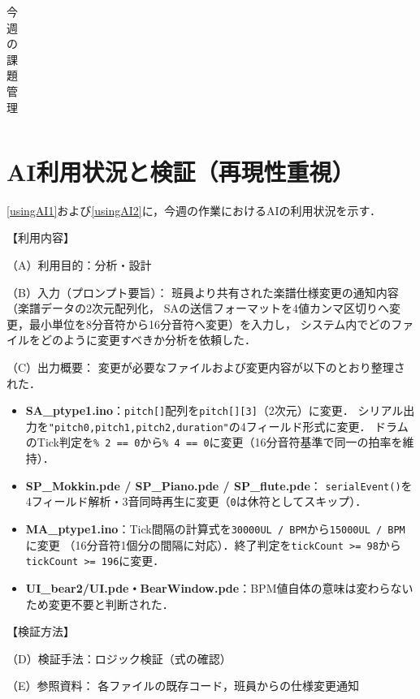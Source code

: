\documentclass[uplatex,dvipdfmx]{jlreq}
\newcounter{aibox}
\begin{document}
\begin{table}[H]
\begin{tabular}{c|c|c|c|c|c|c}
  \end{tabular}
  \caption{今週の課題管理}
  \label{work_admin}
\end{table}


\newpage
\section{AI利用状況と検証（再現性重視）}
\ref{usingAI1}および\ref{usingAI2}に，今週の作業におけるAIの利用状況を示す．

\begin{tcolorbox}[title = AI利用内容1：楽譜仕様変更の影響範囲分析, arc=3mm, colback=white, breakable]
    \label{usingAI1}
    【利用内容】

     （A）利用目的：分析・設計

     （B）入力（プロンプト要旨）：
     班員より共有された楽譜仕様変更の通知内容（楽譜データの2次元配列化，
     SAの送信フォーマットを4値カンマ区切りへ変更，最小単位を8分音符から16分音符へ変更）を入力し，
     システム内でどのファイルをどのように変更すべきか分析を依頼した．

     （C）出力概要：
     変更が必要なファイルおよび変更内容が以下のとおり整理された．
     \begin{itemize}
       \item \textbf{SA\_ptype1.ino}：\texttt{pitch[]}配列を\texttt{pitch[][3]}（2次元）に変更．
             シリアル出力を\texttt{"pitch0,pitch1,pitch2,duration"}の4フィールド形式に変更．
             ドラムのTick判定を\texttt{\% 2 == 0}から\texttt{\% 4 == 0}に変更（16分音符基準で同一の拍率を維持）．
       \item \textbf{SP\_Mokkin.pde / SP\_Piano.pde / SP\_flute.pde}：
             \texttt{serialEvent()}を4フィールド解析・3音同時再生に変更（\texttt{0}は休符としてスキップ）．
       \item \textbf{MA\_ptype1.ino}：Tick間隔の計算式を\texttt{30000UL / BPM}から\texttt{15000UL / BPM}に変更
             （16分音符1個分の間隔に対応）．終了判定を\texttt{tickCount >= 98}から\texttt{tickCount >= 196}に変更．
       \item \textbf{UI\_bear2/UI.pde・BearWindow.pde}：BPM値自体の意味は変わらないため変更不要と判断された．
     \end{itemize}

    【検証方法】

     （D）検証手法：ロジック検証（式の確認）

     （E）参照資料：
     各ファイルの既存コード，班員からの仕様変更通知


\end{tcolorbox}
\end{document}
